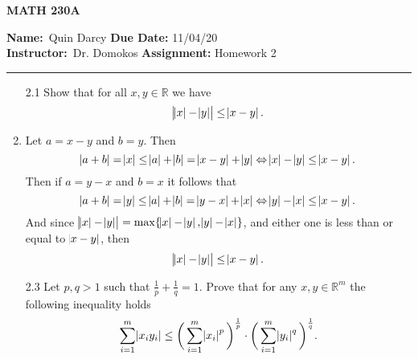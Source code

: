 \documentclass[12pt]{article}
\makeatletter
\theoremstyle{definition}
\theoremstyle{remark}
\renewenvironment{proof}[1][\proofname]{\par
  \pushQED{\qed}%
  \normalfont \topsep6\p@\@plus6\p@\relax
  \list{}{\leftmargin=0mm
          \rightmargin=4mm
          \settowidth{\itemindent}{\itshape#1}%
          \labelwidth=\itemindent
          \parsep=0pt \listparindent=\parindent 
  }
  \item[\hskip\labelsep
        \itshape
    #1\@addpunct{.}]\ignorespaces
}{%
  \popQED\endlist\@endpefalse
}
\let\oldproofname=\proofname
\renewcommand{\proofname}{\bf{\textit{\oldproofname}}}
\makeatother
\begin{document}
\thispagestyle{empty}\hline

\begin{center}
	\vspace{.4cm} {\textbf { \large MATH 230A}}
\end{center}
{\textbf{Name:}\ Quin Darcy \hspace{\fill} \textbf{Due Date:} 11/04/20   \\
{ \textbf{Instructor:}}\ Dr. Domokos \hspace{\fill} \textbf{Assignment:} Homework 2 \\ \hrule}

\justifying
    \begin{enumerate}[leftmargin=*]
        \item[2.1] Show that for all $x,y\in\mathbb{R}$ we have
            \begin{equation*}
                \abs{\abs{x}-\abs{y}}\leq\abs{x-y}.
            \end{equation*}
            \begin{proof}
                Let $a=x-y$ and $b=y$. Then
                    \begin{equation*}
                        \abs{a+b}=\abs{x}\leq \abs{a}+\abs{b}=\abs{x-y}+\abs{y} \Leftrightarrow \abs{x}-\abs{y}\leq\abs{x-y}.
                    \end{equation*}
                Then if $a=y-x$ and $b=x$ it follows that 
                    \begin{equation*}
                        \abs{a+b}=\abs{y}\leq\abs{a}+\abs{b}=\abs{y-x}+\abs{x}\Leftrightarrow\abs{y}-\abs{x}\leq\abs{x-y}.
                    \end{equation*}
                And since $\abs{\abs{x}-\abs{y}}=\max\{\abs{x}-\abs{y},\abs{y}-\abs{x}\}$, and either one is less than or equal to $\abs{x-y}$, then 
                    \begin{equation*}
                        \abs{\abs{x}-\abs{y}}\leq\abs{x-y}.
                    \end{equation*}
            \end{proof}
        \item[2.3] Let $p,q>1$ such that $\frac{1}{p}+\frac{1}{q}=1$. Prove that for any $x,y\in\mathbb{R}^m$ the following inequality holds
            \begin{equation*}
                \sum_{i=1}^m\abs{x_iy_i}\leq\bigg(\sum_{i=1}^m\abs{x_i}^p\bigg)^{\frac{1}{p}}\cdot\bigg(\sum_{i=1}^{m}\abs{y_i}^q\bigg)^{\frac{1}{q}}.
            \end{equation*}

\end{enumerate}
\end{document}
